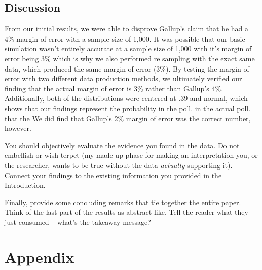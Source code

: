 \documentclass{article}\usepackage[]{graphicx}\usepackage[]{xcolor}
\begin{document}
\begin{multicols}{2}
\section{Discussion}

  From our initial results, we were able to disprove Gallup's claim that he had a 4\% margin of error with a sample size of 1,000. It was possible that our basic simulation wasn't entirely accurate at a sample size of 1,000 with it's margin of error being 3\% which is why we also performed re sampling with the exact same data, which produced the same margin of error (3\%). By testing the margin of error with two different data production methods, we ultimately verified our finding that the actual margin of error is 3\% rather than Gallup's 4\%. Additionally, both of the distributions were centered at .39 and normal, which shows that our findings represent the probability in the poll. in the actual poll. that the We did find that Gallup's 2\% margin of error was the correct number, however. 

 You should objectively evaluate the evidence you found in the data. Do not embellish or wish-terpet (my made-up phase for making an interpretation you, or the researcher, wants to be true without the data \emph{actually} supporting it). Connect your findings to the existing information you provided in the Introduction.

Finally, provide some concluding remarks that tie together the entire paper. Think of the last part of the results as abstract-like. Tell the reader what they just consumed -- what's the takeaway message?

\vspace{2em}


\begin{tiny}

\end{tiny}
\end{multicols}

\newpage
\onecolumn
\section{Appendix}
\end{document}

